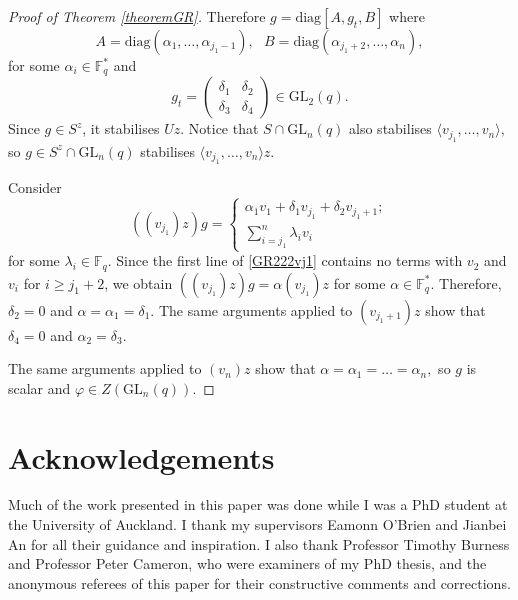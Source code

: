 \documentclass[a4paper,reqno,11pt]{amsart}
\theoremstyle{definition}
\theoremstyle{remark}
\numberwithin{equation}{section}
\newcommand{\diag}{\mathrm{diag}}
\newcommand{\GL}{{\mathrm{GL}}}
\begin{document}
\begin{proof}[Proof of Theorem {\rm \ref{theoremGR}}]
 Therefore $g=\diag[A,g_t, B]$ where $$A=\diag(\alpha_1, \ldots, \alpha_{j_1-1}), \text{ }B=\diag(\alpha_{j_1+2}, \ldots, \alpha_{n}),$$  for some $\alpha_i \in \mathbb{F}_q^*$ and $$g_t = \left( \begin{matrix} \delta_1 & \delta_2 \\ \delta_3 & \delta_4  \end{matrix} \right) \in \GL_2(q).$$ Since $g \in S^z$, it stabilises $Uz.$
 Notice that $S \cap \GL_n(q)$ also stabilises $\langle v_{j_1}, \ldots, v_n \rangle,$ so $g \in S^z \cap \GL_n(q)$ stabilises $\langle v_{j_1}, \ldots, v_n \rangle z$. 
 
 Consider 
\begin{equation}
\label{GR222vj1}
((v_{j_1})z)g= 
 \begin{cases}
 \alpha_1 v_1 + \delta_1 v_{j_1} + \delta_2 v_{j_1+1};\\
 \sum_{i=j_1}^n \lambda_i v_i
 \end{cases}
\end{equation}
 for some $\lambda_i \in \mathbb{F}_q.$ Since the first line of \eqref{GR222vj1} contains no terms with $v_2$ and $v_i$ for $i \ge j_1+2$, we obtain   
 $((v_{j_1})z)g= \alpha (v_{j_1})z $ for some $\alpha \in \mathbb{F}_q^*.$ Therefore, $\delta_2=0$ and $\alpha= \alpha_1 = \delta_1.$ The same arguments applied to $(v_{j_1+1})z$ show that
 $\delta_4=0$ and $\alpha_2=\delta_3.$ 
 
   The same arguments applied to $(v_{n})z$ show that
$\alpha= \alpha_1 = \ldots =\alpha_n,$ so $g$ is scalar and $\varphi \in Z(\GL_n(q)).$
\end{proof}

\section*{Acknowledgements}
Much of the work presented in this paper was done while I was a PhD student at the University of Auckland. I thank my supervisors Eamonn O'Brien and Jianbei An for all their guidance and inspiration. I also thank Professor Timothy  Burness and Professor Peter Cameron, who were  examiners of my PhD thesis, and the anonymous referees of this paper for their constructive comments and corrections.





\end{document}
